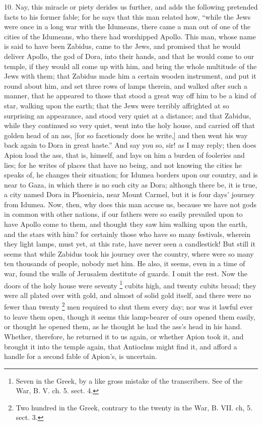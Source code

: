10. Nay, this miracle or piety derides us further, and adds the following
pretended facts to his former fable; for he says that this man related
how, ``while the Jews were once in a long war with the Idumeans, there came
a man out of one of the cities of the Idumeans, who there had worshipped
Apollo. This man, whose name is said to have been Zabidus, came to the
Jews, and promised that he would deliver Apollo, the god of Dora, into
their hands, and that he would come to our temple, if they would all come
up with him, and bring the whole multitude of the Jews with them; that
Zabidus made him a certain wooden instrument, and put it round about him,
and set three rows of lamps therein, and walked after such a manner, that
he appeared to those that stood a great way off him to be a kind of star,
walking upon the earth; that the Jews were terribly affrighted at so
surprising an appearance, and stood very quiet at a distance; and that
Zabidus, while they continued so very quiet, went into the holy house, and
carried off that golden head of an ass, [for so facetiously does he
write,] and then went his way back again to Dora in great haste.'' And say
you so, sir! as I may reply; then does Apion load the ass, that is,
himself, and lays on him a burden of fooleries and lies; for he writes of
places that have no being, and not knowing the cities he speaks of, he
changes their situation; for Idumea borders upon our country, and is near
to Gaza, in which there is no such city as Dora; although there be, it is
true, a city named Dora in Phoenicia, near Mount Carmel, but it is four
days' journey from Idumea. Now, then, why does this man accuse us, because
we have not gods in common with other nations, if our fathers were so
easily prevailed upon to have Apollo come to them, and thought they saw
him walking upon the earth, and the stars with him? for certainly those
who have so many festivals, wherein they light lamps, must yet, at this
rate, have never seen a candlestick! But still it seems that while Zabidus
took his journey over the country, where were so many ten thousands of
people, nobody met him. He also, it seems, even in a time of war, found
the walls of Jerusalem destitute of guards. I omit the rest. Now the doors
of the holy house were seventy \footnote{Seven in the Greek, by a
like gross mistake of the transcribers. See of the War, B. V. ch. 5. sect.
4.} cubits
high, and twenty cubits broad; they were all plated over with gold, and
almost of solid gold itself, and there were no fewer than twenty \footnote{Two hundred in the
Greek, contrary to the twenty in the War, B. VII. ch, 5. sect. 3.}
men required to shut them every day; nor was it lawful ever to leave them
open, though it seems this lamp-bearer of ours opened them easily, or
thought he opened them, as he thought he had the ass's head in his hand.
Whether, therefore, he returned it to us again, or whether Apion took it,
and brought it into the temple again, that Antiochus might find it, and
afford a handle for a second fable of Apion's, is uncertain.

